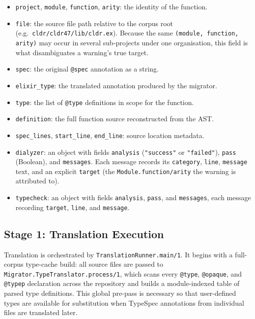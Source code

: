 \begin{itemize}
    \item \texttt{project}, \texttt{module}, \texttt{function}, \texttt{arity}: the identity of the function.
    \item \texttt{file}: the source file path relative to the corpus root (e.g.\ \texttt{cldr/cldr47/lib/cldr.ex}). Because the same \texttt{(module, function, arity)} may occur in several sub-projects under one organisation, this field is what disambiguates a warning's true target.
    \item \texttt{spec}: the original \texttt{@spec} annotation as a string.
    \item \texttt{elixir\_type}: the translated annotation produced by the migrator.
    \item \texttt{type}: the list of \texttt{@type} definitions in scope for the function.
    \item \texttt{definition}: the full function source reconstructed from the AST.
    \item \texttt{spec\_lines}, \texttt{start\_line}, \texttt{end\_line}: source location metadata.
    \item \texttt{dialyzer}: an object with fields \texttt{analysis} (\texttt{"success"} or \texttt{"failed"}), \texttt{pass} (Boolean), and \texttt{messages}. Each message records its \texttt{category}, \texttt{line}, \texttt{message} text, and an explicit \texttt{target} (the \texttt{Module.function/arity} the warning is attributed to).
    \item \texttt{typecheck}: an object with fields \texttt{analysis}, \texttt{pass}, and \texttt{messages}, each message recording \texttt{target}, \texttt{line}, and \texttt{message}.
\end{itemize}

\subsection{Stage 1: Translation Execution}

Translation is orchestrated by \texttt{TranslationRunner.main/1}.
It begins with a full-corpus type-cache build: all source files are passed to \texttt{Migrator.TypeTranslator.process/1}, which scans every \texttt{@type}, \texttt{@opaque}, and \texttt{@typep} declaration across the repository and builds a module-indexed table of parsed type definitions.
This global pre-pass is necessary so that user-defined types are available for substitution when TypeSpec annotations from individual files are translated later.

